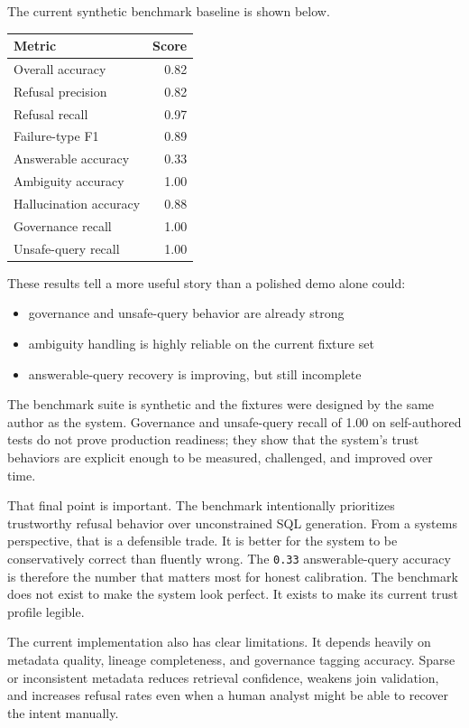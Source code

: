 \documentclass[11pt]{article}
\begin{document}
The current synthetic benchmark baseline is shown below.

\begin{center}
\begin{tabular}{lr}
\toprule
\textbf{Metric} & \textbf{Score} \\
\midrule
Overall accuracy & 0.82 \\
Refusal precision & 0.82 \\
Refusal recall & 0.97 \\
Failure-type F1 & 0.89 \\
Answerable accuracy & 0.33 \\
Ambiguity accuracy & 1.00 \\
Hallucination accuracy & 0.88 \\
Governance recall & 1.00 \\
Unsafe-query recall & 1.00 \\
\bottomrule
\end{tabular}
\end{center}

These results tell a more useful story than a polished demo alone could:

\begin{itemize}[leftmargin=1.4em]
  \item governance and unsafe-query behavior are already strong
  \item ambiguity handling is highly reliable on the current fixture set
  \item answerable-query recovery is improving, but still incomplete
\end{itemize}

The benchmark suite is synthetic and the fixtures were designed by the same author as the system. Governance and unsafe-query recall of 1.00 on self-authored tests do not prove production readiness; they show that the system's trust behaviors are explicit enough to be measured, challenged, and improved over time.

That final point is important. The benchmark intentionally prioritizes trustworthy refusal behavior over unconstrained SQL generation. From a systems perspective, that is a defensible trade. It is better for the system to be conservatively correct than fluently wrong. The \texttt{0.33} answerable-query accuracy is therefore the number that matters most for honest calibration. The benchmark does not exist to make the system look perfect. It exists to make its current trust profile legible.

The current implementation also has clear limitations. It depends heavily on metadata quality, lineage completeness, and governance tagging accuracy. Sparse or inconsistent metadata reduces retrieval confidence, weakens join validation, and increases refusal rates even when a human analyst might be able to recover the intent manually.
\end{document}
